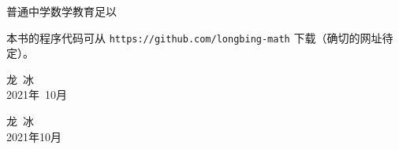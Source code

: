 \documentclass[main.tex]{subfiles}
\begin{document}
普通中学数学教育足以


本书的程序代码可从 \verb|https://github.com/longbing-math| 下载（确切的网址待定）。


{\kaishu
	\begin{center}
		\hspace*{88mm}龙\,   冰\\
		\hspace*{88mm}2021年~10月
	\end{center}
}

\begin{flushright}
	\centering
{\kaishu 龙\,  冰}\\
2021年10月
\end{flushright}
\end{document}
